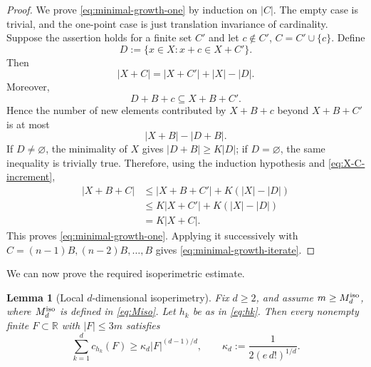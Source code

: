 \documentclass[11pt]{article}
\newtheorem{lemma}[theorem]{Lemma}
\theoremstyle{definition}
\newcommand{\R}{\mathbb{R}}
\newcommand{\1}{\mathbf{1}}
\begin{document}
\begin{proof}
We prove \eqref{eq:minimal-growth-one} by induction on $|C|$.  The empty case is trivial, and the one-point case is just translation invariance of cardinality.  Suppose the assertion holds for a finite set $C'$ and let $c\notin C'$, $C=C'\cup\{c\}$.  Define
\[
  D:=\{x\in X:x+c\in X+C'\}.
\]
Then
\begin{equation}\label{eq:X-C-increment}
  |X+C|=|X+C'|+|X|-|D|.
\end{equation}
Moreover,
\[
  D+B+c\subseteq X+B+C'.
\]
Hence the number of new elements contributed by $X+B+c$ beyond $X+B+C'$ is at most
\[
  |X+B|-|D+B|.
\]
If $D\ne\varnothing$, the minimality of $X$ gives $|D+B|\ge K|D|$; if $D=\varnothing$, the same inequality is trivially true.  Therefore, using the induction hypothesis and \eqref{eq:X-C-increment},
\begin{align*}
  |X+B+C|
  &\le |X+B+C'|+K(|X|-|D|)\\
  &\le K|X+C'|+K(|X|-|D|)\\
  &=K|X+C|.
\end{align*}
This proves \eqref{eq:minimal-growth-one}.  Applying it successively with $C=(n-1)B,(n-2)B,\ldots,B$ gives \eqref{eq:minimal-growth-iterate}.
\end{proof}

We can now prove the required isoperimetric estimate.

\begin{lemma}[Local $d$-dimensional isoperimetry]\label{lem:isoperimetry}
Fix $d\ge2$, and assume $m\ge M_d^{\rm iso}$, where $M_d^{\rm iso}$ is defined in \eqref{eq:Miso}.  Let $h_k$ be as in \eqref{eq:hk}.  Then every nonempty finite $F\subset\R$ with $|F|\le3m$ satisfies
\begin{equation}\label{eq:isoperimetry}
  \sum_{k=1}^d c_{h_k}(F)
  \ge \kappa_d |F|^{(d-1)/d},
  \qquad
  \kappa_d:=\frac1{2(e\,d!)^{1/d}}.
\end{equation}
\end{lemma}
\end{document}
